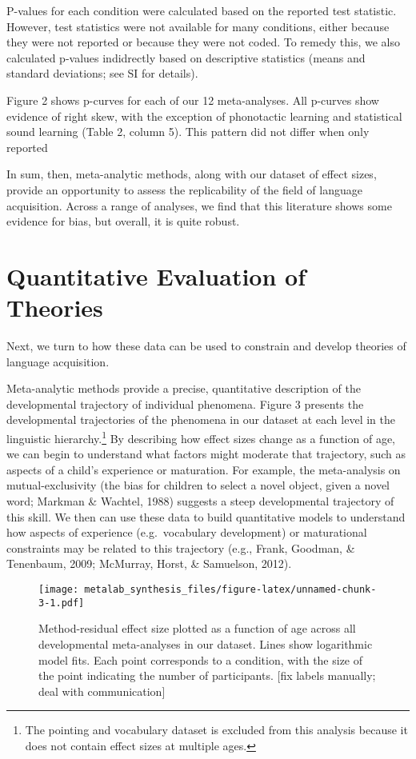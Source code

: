 \documentclass[english,floatsintext,man]{apa6}
\begin{document}
P-values for each condition were calculated based on the reported test
statistic. However, test statistics were not available for many
conditions, either because they were not reported or because they were
not coded. To remedy this, we also calculated p-values indidrectly based
on descriptive statistics (means and standard deviations; see SI for
details).

Figure 2 shows p-curves for each of our 12 meta-analyses. All p-curves
show evidence of right skew, with the exception of phonotactic learning
and statistical sound learning (Table 2, column 5). This pattern did not
differ when only reported

In sum, then, meta-analytic methods, along with our dataset of effect
sizes, provide an opportunity to assess the replicability of the field
of language acquisition. Across a range of analyses, we find that this
literature shows some evidence for bias, but overall, it is quite
robust.

\section{Quantitative Evaluation of
Theories}\label{quantitative-evaluation-of-theories}

Next, we turn to how these data can be used to constrain and develop
theories of language acquisition.

Meta-analytic methods provide a precise, quantitative description of the
developmental trajectory of individual phenomena. Figure 3 presents the
developmental trajectories of the phenomena in our dataset at each level
in the linguistic
hierarchy.\footnote{The pointing and vocabulary dataset is excluded from this analysis because it does not contain effect sizes at multiple ages.}
By describing how effect sizes change as a function of age, we can begin
to understand what factors might moderate that trajectory, such as
aspects of a child's experience or maturation. For example, the
meta-analysis on mutual-exclusivity (the bias for children to select a
novel object, given a novel word; Markman \& Wachtel, 1988) suggests a
steep developmental trajectory of this skill. We then can use these data
to build quantitative models to understand how aspects of experience
(e.g.~vocabulary development) or maturational constraints may be related
to this trajectory (e.g., Frank, Goodman, \& Tenenbaum, 2009; McMurray,
Horst, \& Samuelson, 2012).

\begin{figure}[htbp]
\centering
\texttt{[image: metalab\_synthesis\_files/figure-latex/unnamed-chunk-3-1.pdf]}
\caption{Method-residual effect size plotted as a function of age across
all developmental meta-analyses in our dataset. Lines show logarithmic
model fits. Each point corresponds to a condition, with the size of the
point indicating the number of participants. {[}fix labels manually;
deal with communication{]}}
\end{figure}
\end{document}
